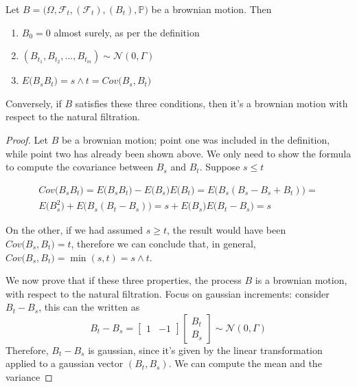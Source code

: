 \begin{proposition}
    Let $B = \big( \Omega, \mathcal{F}_t, (\mathcal{F}_t), (B_t), \mathbb{P} \big)$ be a brownian motion. Then
    \begin{enumerate}
        \item $B_0 = 0$ almost surely, as per the definition
        \item $(B_{t_1},B_{t_2},...,B_{t_m}) \sim \mathcal{N}(0,\Gamma)$
        \item $E \big( B_s B_t \big) = s \wedge t = Cov\big(B_s,B_t\big)$
    \end{enumerate}
    Conversely, if $B$ satisfies these three conditions, then it's a brownian motion with respect to the natural filtration. 
\end{proposition}
\begin{proof}
    Let $B$ be a brownian motion; point one was included in the definition, while point two has already been shown above. We only need to show the formula to compute the covariance between $B_s$ and $B_t$. Suppose $s \leq t$

    \begin{gather*}
        Cov\big(B_s B_t\big) = E\big(B_s B_t\big) - E\big(B_s\big) E\big(B_t\big) =  E\big( B_s (B_s - B_s + B_t) \big) = \\
        E\big(B_s^2\big) + E\big( B_s (B_t - B_s) \big) = s + E\big( B_s \big) E\big( B_t - B_s \big) = s
    \end{gather*}

    On the other, if we had assumed $s \geq t$, the result would have been $Cov\big(B_s, B_t\big) = t$, therefore we can conclude that, in general, $Cov\big(B_s, B_t\big) = \min(s,t) = s \wedge t$. 

    We now prove that if these three properties, the process $B$ is a brownian motion, with respect to the natural filtration. Focus on gaussian increments: consider $B_t - B_s$, this can the written as 
    \begin{equation*}
        B_t - B_s = \begin{bmatrix}
        1 & -1
        \end{bmatrix}
        \begin{bmatrix}
            B_t \\ 
            B_s
        \end{bmatrix} \sim \mathcal{N}(0,\Gamma)
    \end{equation*}
    Therefore, $B_t - B_s$ is gaussian, since it's given by the linear transformation applied to a gaussian vector $(B_t, B_s)$. We can compute the mean and the variance


\end{proof}
